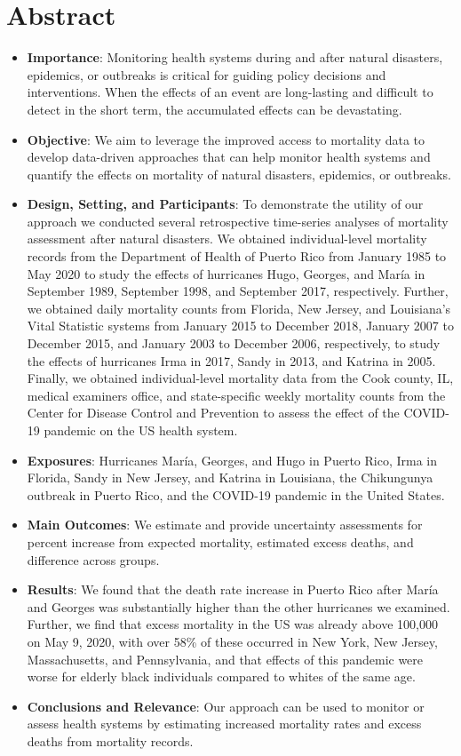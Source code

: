 \documentclass[11pt]{article}
\begin{document}
\section*{Abstract}
\begin{itemize}
    \item \textbf{Importance}: Monitoring health systems during and after natural disasters, epidemics, or outbreaks is critical for guiding policy decisions and interventions. When the effects of an event are long-lasting and difficult to detect in the short term, the accumulated effects can be devastating.
    \item \textbf{Objective}: We aim to leverage the improved access to mortality data to develop data-driven approaches that can help monitor health systems and quantify the effects on mortality of natural disasters, epidemics, or outbreaks. 
    \item \textbf{Design, Setting, and Participants}: To demonstrate the utility of our approach we conducted several retrospective time-series analyses of mortality assessment after natural disasters. We obtained individual-level mortality records from the Department of Health of Puerto Rico from January 1985 to May 2020 to study the effects of hurricanes Hugo, Georges, and Mar\'ia in September 1989, September 1998, and September 2017, respectively. Further, we obtained daily mortality counts from Florida, New Jersey, and Louisiana’s Vital Statistic systems from January 2015 to December 2018, January 2007 to December 2015, and January 2003 to December 2006, respectively, to study the effects of hurricanes Irma in 2017, Sandy in 2013, and Katrina in 2005. Finally, we obtained individual-level mortality data from the Cook county, IL, medical examiners office, and state-specific weekly mortality counts from the Center for Disease Control and Prevention to assess the effect of the COVID-19 pandemic on the US health system.
    \item \textbf{Exposures}: Hurricanes Mar\'ia, Georges, and Hugo in Puerto Rico, Irma in Florida, Sandy in New Jersey, and Katrina in Louisiana, the Chikungunya outbreak in Puerto Rico, and the COVID-19 pandemic in the United States.
    \item \textbf{Main Outcomes}: We estimate and provide uncertainty assessments for percent increase from expected mortality, estimated excess deaths, and difference across groups.
    \item \textbf{Results}: We found that the death rate increase in Puerto Rico after Mar\'ia and Georges was substantially higher than the other hurricanes we examined. Further, we find that excess mortality in the US was already above 100,000 on May 9, 2020, with over 58\% of these occurred in New York, New Jersey, Massachusetts, and Pennsylvania, and that effects of this pandemic were worse for elderly black individuals compared to whites of the same age.
    \item \textbf{Conclusions and Relevance}: Our approach can be used to monitor or assess health systems by estimating increased mortality rates and excess deaths from mortality records. 
\end{itemize}
\end{document}
